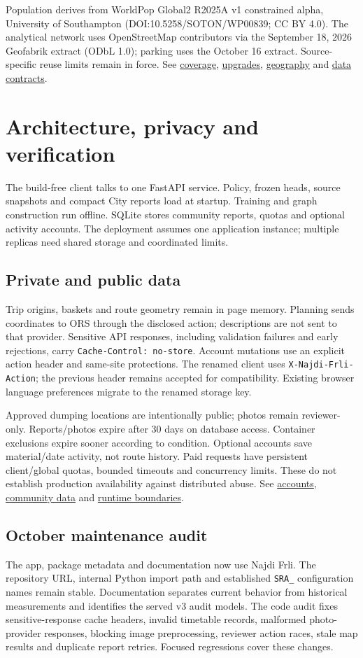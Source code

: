 \documentclass[10pt,a4paper]{article}
\newcommand{\repo}[2]{\href{https://github.com/VikiShmiki/meowchine-learning-repo/blob/main/#1}{#2}}
\newcommand{\code}[1]{\texttt{\small #1}}
\begin{document}
Population derives from WorldPop Global2 R2025A v1 constrained alpha, University of Southampton (DOI:10.5258/SOTON/WP00839; CC BY 4.0). The analytical network uses OpenStreetMap contributors via the September 18, 2026 Geofabrik extract (ODbL 1.0); parking uses the October 16 extract. Source-specific reuse limits remain in force. See \repo{data/coverage/skopje-v1/README.md}{coverage}, \repo{data/upgrades/skopje-v1/README.md}{upgrades}, \repo{data/geography/skopje-v1/README.md}{geography} and \repo{docs/DATA.md}{data contracts}.
\newpage
\section{Architecture, privacy and verification}
The build-free client talks to one FastAPI service. Policy, frozen heads, source snapshots and compact City reports load at startup. Training and graph construction run offline. SQLite stores community reports, quotas and optional activity accounts. The deployment assumes one application instance; multiple replicas need shared storage and coordinated limits.
\subsection{Private and public data}
Trip origins, baskets and route geometry remain in page memory. Planning sends coordinates to ORS through the disclosed action; descriptions are not sent to that provider. Sensitive API responses, including validation failures and early rejections, carry \code{Cache-Control: no-store}. Account mutations use an explicit action header and same-site protections. The renamed client uses \code{X-Najdi-Frli-Action}; the previous header remains accepted for compatibility. Existing browser language preferences migrate to the renamed storage key.

Approved dumping locations are intentionally public; photos remain reviewer-only. Reports/photos expire after 30 days on database access. Container exclusions expire sooner according to condition. Optional accounts save material/date activity, not route history. Paid requests have persistent client/global quotas, bounded timeouts and concurrency limits. These do not establish production availability against distributed abuse. See \repo{docs/ACCOUNTS.md}{accounts}, \repo{docs/COMMUNITY.md}{community data} and \repo{docs/ARCHITECTURE.md}{runtime boundaries}.
\subsection{October maintenance audit}
The app, package metadata and documentation now use Najdi Frli. The repository URL, internal Python import path and established \code{SRA\_} configuration names remain stable. Documentation separates current behavior from historical measurements and identifies the served v3 audit models. The code audit fixes sensitive-response cache headers, invalid timetable records, malformed photo-provider responses, blocking image preprocessing, reviewer action races, stale map results and duplicate report retries. Focused regressions cover these changes.
\end{document}
